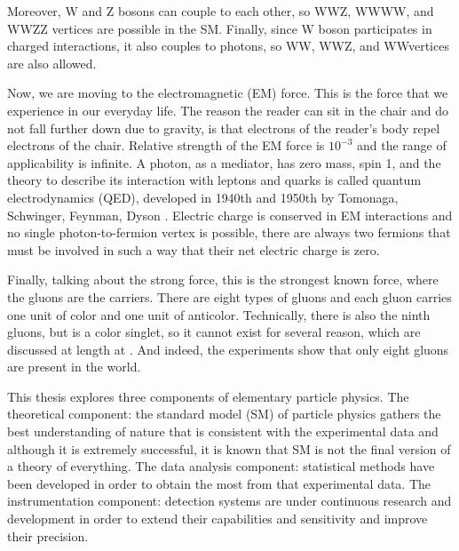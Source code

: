 Moreover, W and Z bosons can couple to each other, so WWZ, WWWW, and WWZZ vertices are possible in the SM. Finally, since W boson participates in charged interactions, it also couples to photons, so \gamma WW, \gamma WWZ, and WW\gamma\gamma vertices are also allowed.

Now, we are moving to the electromagnetic (EM) force. This is the force that we experience in our everyday life. The reason the reader can sit in the chair and do not fall further down due to gravity, is that electrons of the reader's body repel electrons of the chair. Relative strength of the EM force is $10^{-3}$ and the range of applicability is infinite. A photon, as a mediator, has zero mass, spin 1, and the theory to describe its interaction with leptons and quarks is called quantum electrodynamics (QED), developed in 1940th and 1950th by Tomonaga, Schwinger, Feynman, Dyson \cite{qed_fathers}. Electric charge is conserved in EM interactions and no single photon-to-fermion vertex is possible, there are always two fermions that must be involved in such a way that their net electric charge is zero. 

Finally, talking about the strong force, this is the strongest known force, where the gluons are the carriers. There are eight types of gluons and each gluon carries one unit of color and one unit of anticolor. Technically, there is also the ninth gluons, but is a color singlet, so it cannot exist for several reason, which are discussed at length at \cite{griffiths_hep}. And indeed, the experiments show \cite{pdg} that only eight gluons are present in the world.  


	








This thesis explores three components of elementary particle physics. The theoretical component: the standard model (SM) of particle physics gathers the best understanding of nature that is consistent with the experimental data and although it is extremely successful, it is known that SM is not the final version of a theory of everything. The data analysis component: statistical methods have been developed in order to obtain the most from that experimental data. The instrumentation component: detection systems are under continuous research and development in order to extend their capabilities and sensitivity and improve their precision. 

